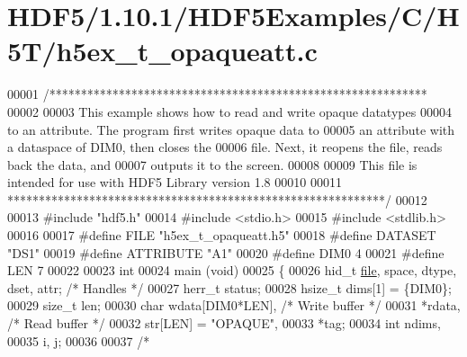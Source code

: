 \hypertarget{_h_d_f5_21_810_81_2_h_d_f5_examples_2_c_2_h5_t_2h5ex__t__opaqueatt_8c_source}{}\section{H\+D\+F5/1.10.1/\+H\+D\+F5\+Examples/\+C/\+H5\+T/h5ex\+\_\+t\+\_\+opaqueatt.c}
\label{_h_d_f5_21_810_81_2_h_d_f5_examples_2_c_2_h5_t_2h5ex__t__opaqueatt_8c_source}

\begin{DoxyCode}
00001 \textcolor{comment}{/************************************************************}
00002 \textcolor{comment}{}
00003 \textcolor{comment}{  This example shows how to read and write opaque datatypes}
00004 \textcolor{comment}{  to an attribute.  The program first writes opaque data to}
00005 \textcolor{comment}{  an attribute with a dataspace of DIM0, then closes the}
00006 \textcolor{comment}{  file. Next, it reopens the file, reads back the data, and}
00007 \textcolor{comment}{  outputs it to the screen.}
00008 \textcolor{comment}{}
00009 \textcolor{comment}{  This file is intended for use with HDF5 Library version 1.8}
00010 \textcolor{comment}{}
00011 \textcolor{comment}{ ************************************************************/}
00012 
00013 \textcolor{preprocessor}{#include "hdf5.h"}
00014 \textcolor{preprocessor}{#include <stdio.h>}
00015 \textcolor{preprocessor}{#include <stdlib.h>}
00016 
00017 \textcolor{preprocessor}{#define FILE            "h5ex\_t\_opaqueatt.h5"}
00018 \textcolor{preprocessor}{#define DATASET         "DS1"}
00019 \textcolor{preprocessor}{#define ATTRIBUTE       "A1"}
00020 \textcolor{preprocessor}{#define DIM0            4}
00021 \textcolor{preprocessor}{#define LEN             7}
00022 
00023 \textcolor{keywordtype}{int}
00024 main (\textcolor{keywordtype}{void})
00025 \{
00026     hid\_t       \hyperlink{structfile}{file}, space, dtype, dset, attr;     \textcolor{comment}{/* Handles */}
00027     herr\_t      status;
00028     hsize\_t     dims[1] = \{DIM0\};
00029     \textcolor{keywordtype}{size\_t}      len;
00030     \textcolor{keywordtype}{char}        wdata[DIM0*LEN],                    \textcolor{comment}{/* Write buffer */}
00031                 *rdata,                             \textcolor{comment}{/* Read buffer */}
00032                 str[LEN] = \textcolor{stringliteral}{"OPAQUE"},
00033                 *tag;
00034     \textcolor{keywordtype}{int}         ndims,
00035                 i, j;
00036 
00037     \textcolor{comment}{/*}

\end{DoxyCode}
